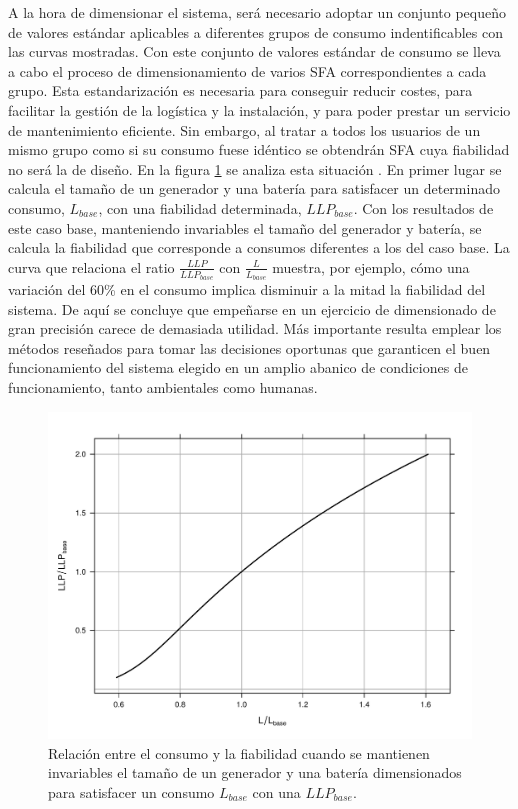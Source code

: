 A la hora de dimensionar el sistema, será necesario adoptar un conjunto
pequeño de valores estándar aplicables a diferentes grupos de consumo
indentificables con las curvas mostradas. Con este conjunto de valores
estándar de consumo se lleva a cabo el proceso de dimensionamiento
de varios SFA correspondientes a cada grupo. Esta estandarización
es necesaria para conseguir reducir costes, para facilitar la gestión
de la logística y la instalación, y para poder prestar un servicio
de mantenimiento eficiente. Sin embargo, al tratar a todos los usuarios
de un mismo grupo como si su consumo fuese idéntico se obtendrán SFA
cuya fiabilidad no será la de diseño. En la figura \ref{fig:ConsumoLLP}
se analiza esta situación \citep{Lorenzo.Narvarte2000}. En primer
lugar se calcula el tamaño de un generador y una batería para satisfacer
un determinado consumo, $L_{base}$, con una fiabilidad determinada,
$LLP_{base}$. Con los resultados de este caso base, manteniendo invariables
el tamaño del generador y batería, se calcula la fiabilidad que corresponde
a consumos diferentes a los del caso base. La curva que relaciona
el ratio $\frac{LLP}{LLP_{base}}$ con $\frac{L}{L_{base}}$
muestra, por ejemplo, cómo una variación del 60\% en el consumo implica
disminuir a la mitad la fiabilidad del sistema. De aquí se concluye
que empeñarse en un ejercicio de dimensionado de gran precisión carece
de demasiada utilidad. Más importante resulta emplear los métodos
reseñados para tomar las decisiones oportunas que garanticen el buen
funcionamiento del sistema elegido en un amplio abanico de condiciones
de funcionamiento, tanto ambientales como humanas.

%
\begin{figure}
\includegraphics[scale=0.6]{../figs/ConsumoLLP}

\caption{Relación entre el consumo y la fiabilidad cuando se mantienen invariables
el tamaño de un generador y una batería dimensionados para satisfacer
un consumo $L_{base}$ con una $LLP_{base}$.\label{fig:ConsumoLLP}}



\end{figure}


